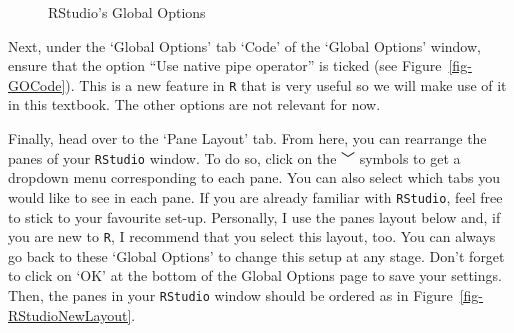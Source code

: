 \documentclass[
  letterpaper,
  DIV=11,
  numbers=noendperiod,
  oneside]{scrreprt}
\begin{document}
\begin{figure}
\begin{minipage}{0.50\linewidth}
{}


\end{minipage}%

\caption{\label{fig-GlobalOptions}RStudio's Global Options}

\end{figure}%

Next, under the `Global Options' tab `Code' of the `Global Options'
window, ensure that the option ``Use native pipe operator'' is ticked
(see Figure~\ref{fig-GOCode}). This is a new feature in \texttt{R} that
is very useful so we will make use of it in this textbook. The other
options are not relevant for now.

Finally, head over to the `Pane Layout' tab. From here, you can
rearrange the panes of your \texttt{RStudio} window. To do so, click on
the ﹀ symbols to get a dropdown menu corresponding to each pane. You
can also select which tabs you would like to see in each pane. If you
are already familiar with \texttt{RStudio}, feel free to stick to your
favourite set-up. Personally, I use the panes layout below and, if you
are new to \texttt{R}, I recommend that you select this layout, too. You
can always go back to these `Global Options' to change this setup at any
stage. Don't forget to click on `OK' at the bottom of the Global Options
page to save your settings. Then, the panes in your \texttt{RStudio}
window should be ordered as in Figure~\ref{fig-RStudioNewLayout}.
\end{document}
